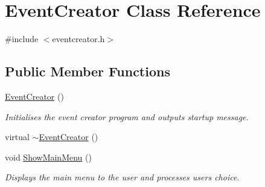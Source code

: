\hypertarget{classEventCreator}{\section{\-Event\-Creator \-Class \-Reference}
\label{classEventCreator}
}


{\ttfamily \#include $<$eventcreator.\-h$>$}

\subsection*{\-Public \-Member \-Functions}
\begin{DoxyCompactItemize}
\item 
\hyperlink{classEventCreator_a23adb753ff46c970018641ba6cd8ad04}{\-Event\-Creator} ()
\begin{DoxyCompactList}\small\item\em \-Initialises the event creator program and outputs startup message. \end{DoxyCompactList}\item 
virtual \hyperlink{classEventCreator_a3e1b2dde8d5979b26019e30fe70b3a96}{$\sim$\-Event\-Creator} ()
\item 
void \hyperlink{classEventCreator_a2d60d294397e0d4d34789b0bfb337b81}{\-Show\-Main\-Menu} ()
\begin{DoxyCompactList}\small\item\em \-Displays the main menu to the user and processes users choice. \end{DoxyCompactList}\end{DoxyCompactItemize}
